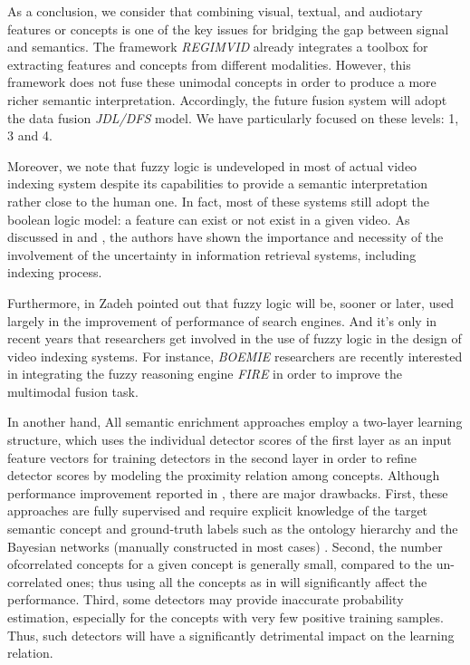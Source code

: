 	
	As a conclusion, we consider that combining visual, textual, and audiotary features or 
		concepts is one of the key issues for bridging the gap between signal and semantics. The framework \emph{REGIMVID}
		already integrates a toolbox for extracting features and concepts from different modalities. 
		However, this framework does not fuse these unimodal concepts in order to produce a more richer semantic interpretation. 
		Accordingly, the future fusion system will adopt the data fusion \emph{JDL/DFS} model. 
		We have particularly focused on these levels: 1, 3 and 4.
 
		Moreover, we note that fuzzy logic is undeveloped in most of actual video indexing system despite its capabilities 
		to provide a semantic interpretation rather close to the human one. In fact, most of these systems 
		still adopt the boolean logic model: a feature can exist or not exist in a given video. 
		As discussed in \citep{Bordogna1995} and \citep{Stoilos2006}, the authors have shown the importance and necessity of
		the involvement of the uncertainty in information retrieval systems, including indexing process.
		
		Furthermore, in \cite{Zadeh2005} Zadeh pointed out that fuzzy logic will be, sooner or later, used largely in 
		the improvement of performance of search engines.
		And it's only in recent years that researchers get involved in the use of fuzzy logic in the design of video indexing systems. 
		For instance, \emph{BOEMIE} researchers are recently interested in integrating the fuzzy reasoning engine \emph{FIRE} in order to improve the multimodal fusion task.

		In another hand, All semantic enrichment approaches employ a two-layer learning structure, which uses the individual detector scores 
		of the first layer as an input feature vectors for training detectors in the second layer in order to refine detector scores by modeling the proximity 			relation among concepts. Although performance improvement reported in \cite{cite5,cite7}, there are major drawbacks. 
		First, these approaches are fully supervised and require explicit knowledge of the target semantic concept and ground-truth 
		labels such as the ontology hierarchy  \cite{cite8} and the Bayesian networks (manually constructed in most cases)
		\cite{cite9}. Second, the number ofcorrelated concepts for a given concept is generally	small, compared to the un-correlated ones; 
		thus using all the concepts as in \cite{cite7} will significantly affect the performance. Third, some detectors may provide inaccurate
		probability estimation, especially for the concepts with very few positive training samples. Thus, such detectors will have a significantly detrimental
		impact on the learning relation.

